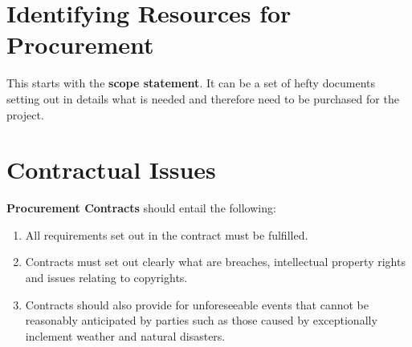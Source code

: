 \documentclass[math,code]{amznotes}
\theoremstyle{remark}
\begin{document}
\section{Identifying Resources for Procurement}
This starts with the \textbf{scope statement}. It can be a set of hefty documents setting out in details what is needed and therefore need to be purchased for the project.

\section{Contractual Issues}
\textbf{Procurement Contracts} should entail the following:
\begin{enumerate}
    \item All requirements set out in the contract must be fulfilled.
    \item Contracts must set out clearly what are breaches, intellectual property rights and issues relating to copyrights.
    \item Contracts should also provide for unforeseeable events that cannot be reasonably anticipated by parties such as those caused by exceptionally inclement weather and natural disasters.
\end{enumerate}
\end{document}
